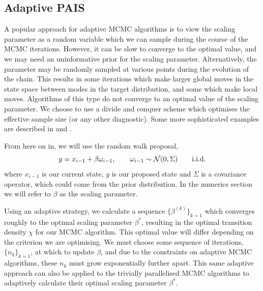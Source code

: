 \documentclass[final]{siamltex}
\begin{document}
\subsection{Adaptive PAIS}\label{sec:adapt}

A popular approach for adaptive MCMC algorithms is to view the scaling
parameter as a random variable which we can sample during the course
of the MCMC iterations. However, it can be slow to converge to the
optimal value, and we may need an
uninformative prior for the scaling parameter. Alternatively, the
parameter may be randomly sampled at various points during the
evolution of the chain. This results in some iterations which make
larger global moves in the state space between modes in the target
distribution, and some which make local moves. Algorithms of this type
do not converge to an optimal value of the scaling parameter. We choose to use a divide and conquer scheme which optimises the
effective sample size (or any other diagnostic). Some more
sophisticated examples are described in \cite{roberts2009examples} and
\cite{Ji2013adaptive}. 

From here on in, we will use the random walk proposal,
\begin{equation}y = x_{i-1}+\beta \omega_{i-1}, \qquad \omega_{i-1}
  \sim \mathcal{N}(0,\Sigma) \qquad {\rm i.i.d.}
\end{equation}
where $x_{i-1}$ is our current state, $y$ is our proposed state and
$\Sigma$ is a covariance operator, which could come from the prior distribution. In the numerics section we will refer to $\beta$ as the scaling parameter.

 Using an adaptive strategy, we calculate a sequence
 $\{\beta^{(k)}\}_{k=1}$ which converges roughly to the optimal
 scaling parameter $\beta^*$, resulting in the optimal transition
 density $\chi$ for our MCMC algorithm. This optimal value will differ
 depending on the criterion we are optimising. We must choose some sequence
 of iterations, $\{n_k\}_{k=1}$, at which to update $\beta$, and due
 to the constraints on adaptive MCMC
 algorithms\cite{roberts2007coupling,roberts2009examples}, these $n_k$
 must grow exponentially further apart. This same adaptive approach
 can also be applied to the trivially parallelised MCMC algorithms to adaptively calculate their optimal scaling parameter $\beta^*$.
\end{document}
